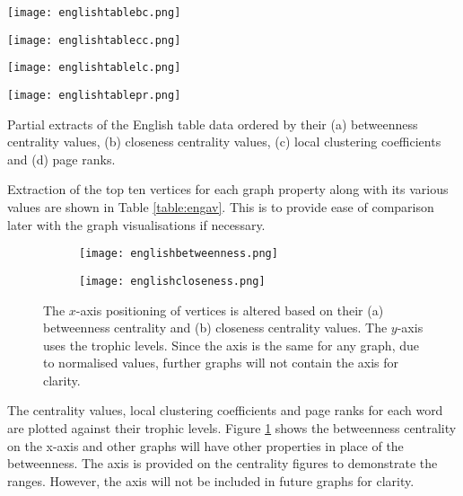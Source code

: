 \begin{table}[!htb]
\centering
\begin{subtable}{.2\textwidth}
	\centering
	\texttt{[image: englishtablebc.png]}
	\caption{}
	\label{table:englishtablebc}
\end{subtable}
\hfill
\begin{subtable}{.2\textwidth}
	\centering
	\texttt{[image: englishtablecc.png]}
	\caption{}
	\label{table:englishtablecc}
\end{subtable}
\hfill
\begin{subtable}{.2\textwidth}
	\centering
	\texttt{[image: englishtablelc.png]}
	\caption{}
	\label{table:englishtablelc}
\end{subtable}
\hfill
\begin{subtable}{.2\textwidth}
	\centering
	\texttt{[image: englishtablepr.png]}
	\caption{}
	\label{table:englishtablepr}
\end{subtable}
\caption{Partial extracts of the English table data ordered by their (a) betweenness centrality values, (b) closeness centrality values, (c) local clustering coefficients and (d) page ranks.}
\label{table:engav}
\end{table}

Extraction of the top ten vertices for each graph property along with its various values are shown in Table \ref{table:engav}. This is to provide ease of comparison later with the graph visualisations if necessary.

\begin{figure}[!htb]
\centering
\begin{subfigure}{.45\textwidth}
	\hspace{-1.2cm} 
	\texttt{[image: englishbetweenness.png]}
	\caption{}
	\label{fig:engbc}
\end{subfigure}
\hfill
\begin{subfigure}{.45\textwidth}
	\hspace{-1cm} 
	\texttt{[image: englishcloseness.png]}
	\caption{}
	\label{fig:engcc}
\end{subfigure}
\caption{The $x$-axis positioning of vertices is altered based on their (a) betweenness centrality and (b) closeness centrality values. The $y$-axis uses the trophic levels. Since the axis is the same for any graph, due to normalised values, further graphs will not contain the axis for clarity.}
\end{figure}

The centrality values, local clustering coefficients and page ranks for each word are plotted against their trophic levels. Figure \ref{fig:engbc} shows the betweenness centrality on the x-axis and other graphs will have other properties in place of the betweenness. The axis is provided on the centrality figures to demonstrate the ranges. However, the axis will not be included in future graphs for clarity.

